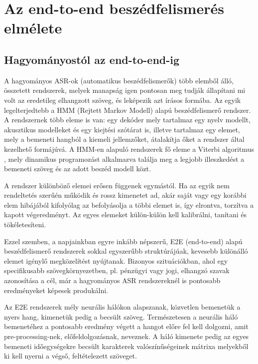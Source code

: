 \chapter{Az end-to-end beszédfelismerés elmélete}

\section{Hagyományostól az end-to-end-ig}

A hagyományos ASR-ok (automatikus beszédfelismerők) több elemből álló, összetett rendszerek, melyek manapság igen pontosan meg tudják állapítani mi volt az eredetileg elhangzott szöveg, és leképezik azt írásos formába. Az egyik legelterjedtebb a HMM (Rejtett Markov Modell) alapú beszédfelismerő rendszer. A rendszernek több eleme is van: egy dekóder mely tartalmaz egy nyelv modellt, akusztikus modelleket és egy kiejtési szótárat is, illetve tartalmaz egy elemet, mely a bemeneti hangból a kiemeli jellemzőket, átalakítja őket a rendszer által kezelhető formájúvá. A HMM-en alapuló rendszerek fő eleme a Viterbi algoritmus \cite{viterbi}, mely dinamikus programozást alkalmazva találja meg a legjobb illeszkedést a bemeneti szöveg és az adott beszéd modell közt.

A rendszer különböző elemei erősen függenek egymástól. Ha az egyik nem rendeltetés szerűén működik és rossz kimenetet ad, akár saját vagy egy korábbi elem hibájából kifolyólag az befolyásolja a többi elemet is, így elrontva, torzítva a kapott végeredményt. Az egyes elemeket külön-külön kell kalibrálni, tanítani és tökéletesíteni.

Ezzel szemben, a napjainkban egyre inkább népszerű, E2E (end-to-end) alapú beszédfelismerő rendszerek sokkal egyszerűbb struktúrájúak, kevesebb különálló elemet igénylő megközelítést nyújtanak. Bizonyos szituációkban, ahol egy specifikusabb szövegkörnyezetben, pl. pénzügyi vagy jogi, elhangzó szavak azonosítása a cél, már a hagyományos ASR rendszereknél is pontosabb eredményeket képesek produkálni.

Az E2E rendszerek mély neurális hálókon alapszanak, közvetlen bemenetük a nyers hang, kimenetük pedig a becsült szöveg. Természetesen a neurális háló bemenetéhez a pontosabb eredmény végett a hangot előre fel kell dolgozni, amit pre-processing-nek, előfeldolgozásnak, neveznek. A háló kimenete pedig az egyes bemeneti időegységekre becsült karakterek valószínűségeinek mátrixa melyekből ki kell nyerni a végső, feltételezett szöveget.

